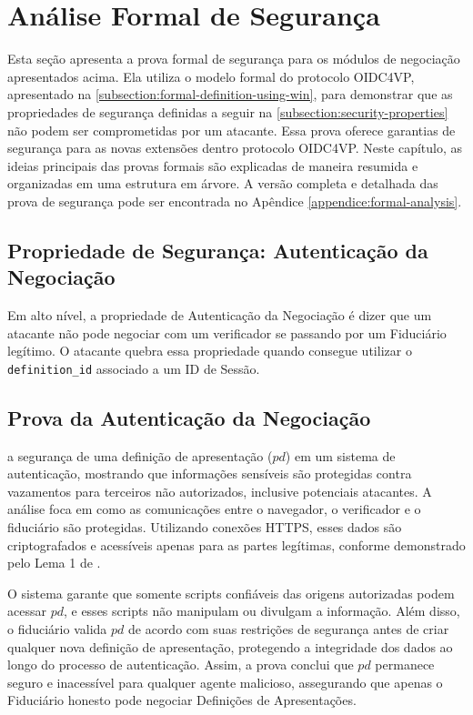 

\section{Análise Formal de Segurança}\label{section:formal-security-analysis}

Esta seção apresenta a prova formal de segurança para os módulos de negociação apresentados acima. Ela utiliza o modelo formal do protocolo \acs{OIDC4VP}, apresentado na \autoref{subsection:formal-definition-using-win}, para demonstrar que as propriedades de segurança definidas a seguir na \autoref{subsection:security-properties} não podem ser comprometidas por um atacante. Essa prova oferece garantias de segurança para as novas extensões dentro protocolo \acs{OIDC4VP}. Neste capítulo, as ideias principais das provas formais são explicadas de maneira resumida e organizadas em uma estrutura em árvore. A versão completa e detalhada das prova de segurança pode ser encontrada no Apêndice \ref{appendice:formal-analysis}.

\subsection{Propriedade de Segurança: Autenticação da Negociação}\label{subsection:security-properties}

Em alto nível, a propriedade de Autenticação da Negociação é dizer que um atacante não pode negociar com um verificador se passando por um Fiduciário legítimo. O atacante quebra essa propriedade quando consegue utilizar o \texttt{definition\_id} associado a um ID de Sessão. 

\subsection{Prova da Autenticação da Negociação}

a segurança de uma definição de apresentação ($pd$) em um sistema de autenticação, mostrando que informações sensíveis são protegidas contra vazamentos para terceiros não autorizados, inclusive potenciais atacantes. A análise foca em como as comunicações entre o navegador, o verificador e o fiduciário são protegidas. Utilizando conexões HTTPS, esses dados são criptografados e acessíveis apenas para as partes legítimas, conforme demonstrado pelo Lema 1 de .

O sistema garante que somente scripts confiáveis das origens autorizadas podem acessar $pd$, e esses scripts não manipulam ou divulgam a informação. Além disso, o fiduciário valida $pd$ de acordo com suas restrições de segurança antes de criar qualquer nova definição de apresentação, protegendo a integridade dos dados ao longo do processo de autenticação. Assim, a prova conclui que $pd$ permanece seguro e inacessível para qualquer agente malicioso, assegurando que apenas o Fiduciário honesto pode negociar Definições de Apresentações.

